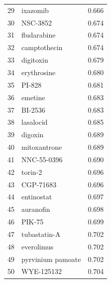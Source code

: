 \documentclass[11pt]{article}
\begin{document}
\begin{table}[h]
\begin{minipage}[t]{0.48\textwidth}
\begin{tabular}{@{}rlr@{}}
29 & ixazomib & 0.666 \\
30 & NSC-3852 & 0.674 \\
31 & fludarabine & 0.674 \\
32 & camptothecin & 0.674 \\
33 & digitoxin & 0.679 \\
34 & erythrosine & 0.680 \\
35 & PI-828 & 0.681 \\
36 & emetine & 0.683 \\
37 & BI-2536 & 0.683 \\
38 & lasalocid & 0.685 \\
39 & digoxin & 0.689 \\
40 & mitoxantrone & 0.689 \\
41 & NNC-55-0396 & 0.690 \\
42 & torin-2 & 0.696 \\
43 & CGP-71683 & 0.696 \\
44 & entinostat & 0.697 \\
45 & auranofin & 0.698 \\
46 & PIK-75 & 0.699 \\
47 & tubastatin-A & 0.702 \\
48 & everolimus & 0.702 \\
49 & pyrvinium pamoate & 0.702 \\
50 & WYE-125132 & 0.704 \\
\bottomrule
\end{tabular}
\end{minipage}
\end{table}
\end{document}
